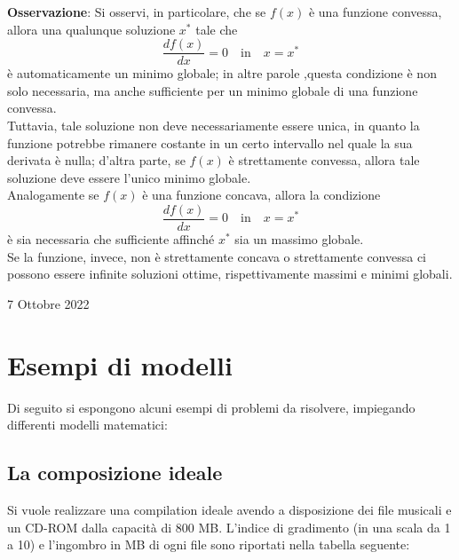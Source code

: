 \documentclass[a4paper]{extarticle}
\begin{document}
\vspace{1em}
\noindent
\textbf{Osservazione}: Si osservi, in particolare, che se $f(x)$ è una funzione convessa, allora una qualunque soluzione $x^*$ tale che
\[\frac{df(x)}{dx}=0 \hspace{1em} \text{in} \hspace{1em} x=x^*\]
è automaticamente un minimo globale; in altre parole ,questa condizione è non solo necessaria, ma anche sufficiente per un minimo globale di una funzione convessa.\\
Tuttavia, tale soluzione non deve necessariamente essere unica, in quanto la funzione potrebbe rimanere costante in un certo intervallo nel quale la sua derivata è nulla; d'altra parte, se $f(x)$ è strettamente convessa, allora tale soluzione deve essere l'unico minimo globale.\\
Analogamente se $f(x)$ è una funzione concava, allora la condizione 
\[\frac{df(x)}{dx}=0 \hspace{1em} \text{in} \hspace{1em} x=x^*\]
è sia necessaria che sufficiente affinché $x^*$ sia un massimo globale.\\
Se la funzione, invece, non è strettamente concava o strettamente convessa ci possono essere infinite soluzioni ottime, rispettivamente massimi e minimi globali.

\newpage
\begin{center}
    7 Ottobre 2022
\end{center}
\vspace{1em}
\noindent
\section{Esempi di modelli}
Di seguito si espongono alcuni esempi di problemi da risolvere, impiegando differenti modelli matematici:

\vspace{1em}
\noindent
\subsection{La composizione ideale}
Si vuole realizzare una compilation ideale avendo a disposizione dei file musicali e un CD-ROM dalla capacità di 800 MB. L'indice di gradimento (in una scala da 1 a 10) e l'ingombro in MB di ogni file sono riportati nella tabella seguente:
\end{document}
